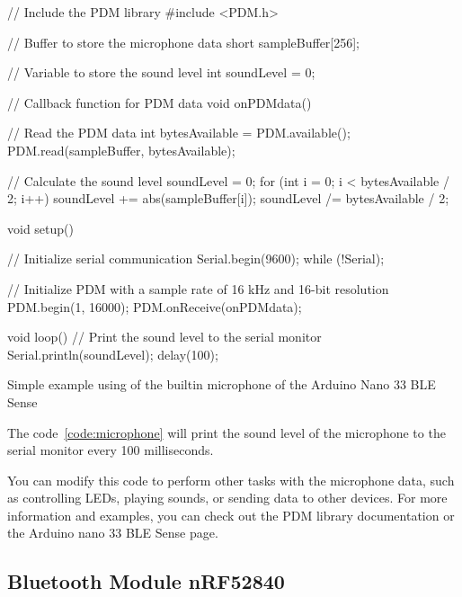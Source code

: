\begin{code}
    \begin{Arduino}
        // Include the PDM library
        #include <PDM.h>
        
        // Buffer to store the microphone data
        short sampleBuffer[256];
        
        // Variable to store the sound level
        int soundLevel = 0;
        
        // Callback function for PDM data
        void onPDMdata() {
            // Read the PDM data
            int bytesAvailable = PDM.available();
            PDM.read(sampleBuffer, bytesAvailable);
            
            // Calculate the sound level
            soundLevel = 0;
            for (int i = 0; i < bytesAvailable / 2; i++) {
                soundLevel += abs(sampleBuffer[i]);
            }
            soundLevel /= bytesAvailable / 2;
        }
        
        void setup() {
            // Initialize serial communication
            Serial.begin(9600);
            while (!Serial);
            
            // Initialize PDM with a sample rate of 16 kHz and 16-bit resolution
            PDM.begin(1, 16000);
            PDM.onReceive(onPDMdata);
        }
        
        void loop() {
            // Print the sound level to the serial monitor
            Serial.println(soundLevel);
            delay(100);
        }
    \end{Arduino}
    \caption{Simple example using of the builtin microphone of the Arduino Nano 33 BLE Sense}\label{code:microphone}
\end{code}


The code~\ref{code:microphone} will print the sound level of the microphone to the serial monitor every 100 milliseconds. 

You can modify this code to perform other tasks with the microphone data, such as controlling LEDs, playing sounds, or sending data to other devices. For more information and examples, you can check out the PDM library documentation or the Arduino nano 33 BLE Sense page. 





\subsection{Bluetooth Module nRF52840}

